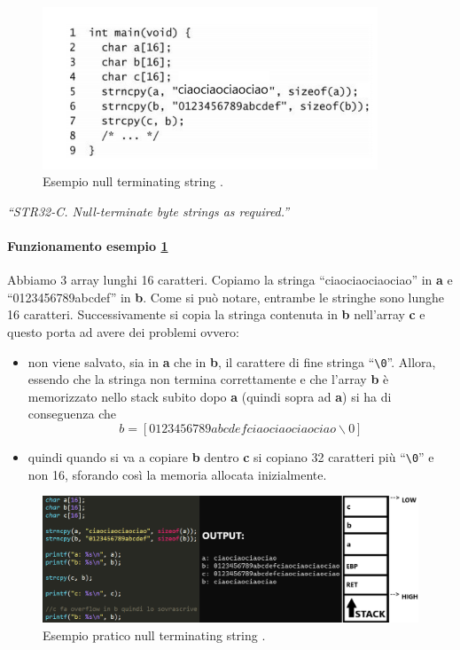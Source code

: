 \begin{figure}[H]
    \centering
    \includegraphics[width=10cm, keepaspectratio]{capitoli/secure_coding/img/cap_2/null_string_new.png}
    \caption{Esempio null terminating string .}\label{fig:null_string}
\end{figure}

\textit{“STR32-C. Null-terminate byte strings as
    required.”}

\paragraph{Funzionamento esempio \ref{fig:null_string}}
Abbiamo 3 array lunghi 16 caratteri. Copia\-mo la stringa ``ciaociaociaociao'' in \textbf{a} e ``0123456789abcdef'' in \textbf{b}. Come si può notare, entrambe le stringhe sono lunghe 16 caratteri. Successivamente si copia la stringa contenuta in \textbf{b} nell'array \textbf{c} e questo porta ad avere dei problemi ovvero:

\begin{itemize}
    \item non viene salvato, sia in \textbf{a} che in \textbf{b}, il carattere di fine stringa ``\verb|\0|''. Allora, essendo che la stringa non termina correttamente e che l'array \textbf{b} è memorizzato nello stack subito dopo \textbf{a} (quindi sopra ad \textbf{a}) si ha di conseguenza che 
          \[b = [0123456789abcdefciaociaociaociao\backslash 0]\]
    \item quindi quando si va a copiare \textbf{b} dentro \textbf{c} si copiano 32
          caratteri più ``\verb|\0|'' e non 16, sforando così la memoria allocata inizialmente.
\end{itemize}

\begin{figure}[H]
	\centering
	\includegraphics[width=12cm, keepaspectratio]{capitoli/secure_coding/img/cap_2/null_string_example.png}
	\caption{Esempio pratico null terminating string .}\label{fig:null_string_example}
\end{figure}

